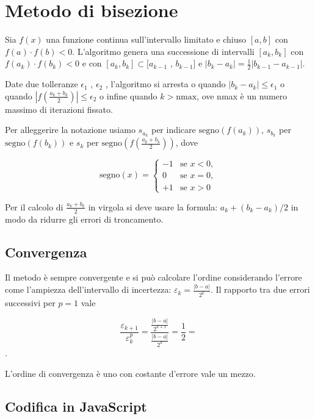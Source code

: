 \section{Metodo di bisezione}

Sia $f (x)$ una funzione continua sull'intervallo limitato e chiuso $[a, b]$ con $f (a) \cdot f (b) < 0$. L'algoritmo genera una successione di intervalli
$[a_k , b_k]$ con $f (a_k ) \cdot f (b_k ) < 0$ e con $[a_k , b_k ] \subset [a_{k-1}$ , $b_{k-1} ]$ e $|b_k - a_k | = \frac{1}{2}|b_{k-1} - a_{k-1} |$. 

Date due tolleranze $\epsilon_1$ , $\epsilon_2$ , l’algoritmo si arresta o quando $|b_k - a_k | \leq \epsilon_1$ o quando $|f (\frac {a_k +b_k}{2} )| \leq
\epsilon_2$ o infine quando $k > \text{nmax}$, ove nmax è un numero massimo di iterazioni fissato.

Per alleggerire la notazione usiamo $s_{a_k}$ per indicare $\mathrm{segno} \left(f\left(a_k\right)\right)$,
$s_{b_k}$ per $\mathrm{segno}(f(b_k))$ e
$s_k$ per $\mathrm{segno}(f (\frac {a_k +b_k}{2}))$, dove

\begin{equation}
    \mathrm{segno}(x) =
    \begin{cases}
        -1 & \text{se } x < 0, \\
         0 & \text{{se }} x = 0, \\
        +1 & \text{{se }} x > 0
    \end{cases}
\end{equation}

Per il calcolo di $\frac{a_k+b_k}{2}$ in virgola si deve usare la formula: $a_k + (b_k - a_k) / 2$ in modo da ridurre gli errori di troncamento.

\subsection{Convergenza}

Il metodo è sempre convergente e si può calcolare l'ordine considerando l'errore
come l'ampiezza dell'intervallo di incertezza: $\varepsilon_k = \frac{|b - a|}{2^k}$.
Il rapporto tra due errori successivi per $p=1$ vale

$$\displaystyle \frac{\varepsilon_{k+1}}{\varepsilon_{k}^p}
=\frac{
    \frac{|b - a|}{2^{k+1}}
  }{
      \frac{|b - a|}{2^k}
  }
  = \frac{1}{2}
= $$.

L'ordine di convergenza è uno con costante d'errore vale un mezzo.

\subsection{Codifica in JavaScript}

